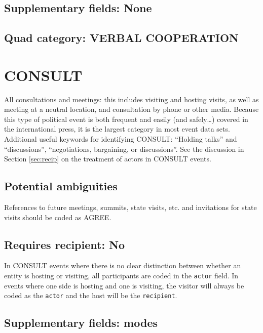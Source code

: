 \documentclass[11pt]{report}
\newcommand{\plcat}[1]{\textsf{#1}}
\newcommand{\txt}[1]{\texttt{#1}}
\begin{document}
\subsection{Supplementary fields: None}

\subsection{Quad category: VERBAL COOPERATION}

\newpage

\section{CONSULT}

All consultations and meetings: this includes visiting and hosting visits, as well as meeting at a neutral location, and consultation by phone or other media. Because this type of political event is both frequent and easily (and safely\ldots) covered in the international press, it is the largest category in most event data sets.  Additional useful keywords for identifying \plcat{CONSULT}: ``Holding talks'' and ``discussions'', ``negotiations, bargaining, or discussions''. See the discussion in Section \ref{sec:recip} on the treatment of actors in \plcat{CONSULT} events.

\subsection{Potential ambiguities}

References to future meetings, summits, state visits, etc. and invitations for state visits should be coded as \plcat{AGREE}.

\subsection{Requires recipient: No}

In \plcat{CONSULT} events where there is no clear distinction between whether an entity is hosting or visiting, all participants are coded in the \txt{actor} field. In events where one side is hosting and one is visiting, the visitor will always be coded as the \txt{actor} and the host will be the \txt{recipient}.

\subsection{Supplementary fields: modes}
\end{document}

